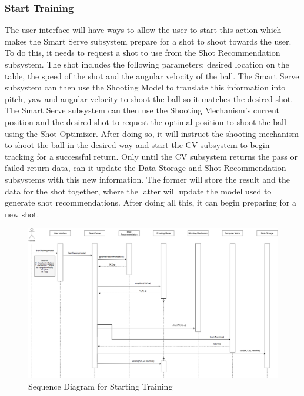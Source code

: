 \documentclass[11pt]{article}
\begin{document}
\subsubsection{Start Training}
The user interface will have ways to allow the user to start this action which makes the Smart Serve subsystem prepare for a shot to shoot towards the user. To do this, it needs to request a shot to use from the Shot Recommendation subsystem. The shot includes the following parameters: desired location on the table, the speed of the shot and the angular velocity of the ball. The Smart Serve subsystem can then use the Shooting Model to translate this information into pitch, yaw and angular velocity to shoot the ball so it matches the desired shot. The Smart Serve subsystem can then use the Shooting Mechanism's current position and the desired shot to request the optimal position to shoot the ball using the Shot Optimizer. After doing so, it will instruct the shooting mechanism to shoot the ball in the desired way and start the CV subsystem to begin tracking for a successful return. Only until the CV subsystem returns the pass or failed return data, can it update the Data Storage and Shot Recommendation subsystems with this new information. The former will store the result and the data for the shot together, where the latter will update the model used to generate shot recommendations. After doing all this, it can begin preparing for a new shot.
\begin{figure}[H]
   \centering
   \includegraphics[width=\textwidth]{img/SequenceDiagram-Start.png}
   \caption{Sequence Diagram for Starting Training}
   \label{fig:start}
\end{figure}
\end{document}
